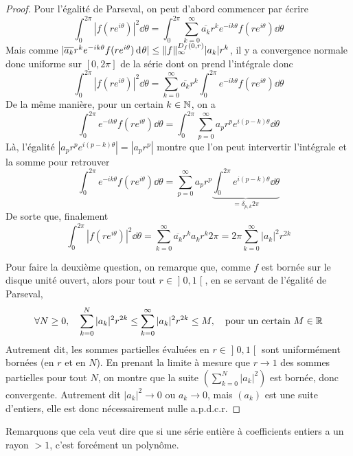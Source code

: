 \documentclass[10pt]{scrartcl}
\begin{document}
    \begin{proof}
        Pour l'égalité de Parseval, on peut d'abord commencer par écrire 
        \[
            \int_0^{2\pi}|f(re^{i\theta})|^2\dd\theta=\int_0^{2\pi}\sum_{k=0}^\infty \overline{a_k}r^ke^{-ik\theta}f(re^{i\theta})\dd\theta
        \]
        Mais comme $|\overline{a_k}r^ke^{-ik\theta}f(re^{i\theta})\operatorname{d\hskip-1pt}\theta|\leq \lVert f\rVert_\infty^{D_f(0,r)}|a_k|r^k$, il y a convergence normale donc uniforme sur $[0,2\pi]$
        de la série dont on prend l'intégrale donc 
        \[
            \int_0^{2\pi}|f(re^{i\theta})|^2\dd\theta=\sum_{k=0}^\infty\overline{a_k}r^k\int_0^{2\pi} e^{-ik\theta}f(re^{i\theta})\dd\theta
        \]
        De la même manière, pour un certain $k\in\operatorname{\mathbb N}$, on a 
        \[
            \int_0^{2\pi} e^{-ik\theta}f(re^{i\theta})\dd\theta=\int_0^{2\pi}\sum_{p=0}^\infty a_pr^pe^{i(p-k)\theta}\dd\theta
        \]
        Là, l'égalité $|a_pr^pe^{i(p-k)\theta}|=|a_pr^p|$ montre que l'on peut intervertir l'intégrale et la somme pour retrouver 
        \[
            \int_0^{2\pi} e^{-ik\theta}f(re^{i\theta})\dd\theta=\sum_{p=0}^\infty a_pr^p\underbrace{\int_0^{2\pi} e^{i(p-k)\theta}\dd\theta}_{=\delta_{p,k}2\pi}
        \]
        De sorte que, finalement 
        \[
            \int_0^{2\pi}|f(re^{i\theta})|^2\dd\theta=\sum_{k=0}^\infty\overline{a_k}r^ka_kr^k2\pi=2\pi\sum_{k=0}^\infty|a_k|^2r^{2k}
        \]


        Pour faire la deuxième question, on remarque que, comme $f$ est bornée sur le disque unité ouvert, 
        alors pour tout $r\in\mathopen]0,1\mathclose[$, en se servant de l'égalité de Parseval, 
        \[
            \forall N\geq0,\quad \sum_{k=0}^N|a_k|^2r^{2k}\leq \sum_{k=0}^\infty |a_k|^2r^{2k}\leq M,\quad \text{pour un certain}\ M\in\operatorname{\mathbb R}
        \]
        Autrement dit, les sommes partielles évaluées en $r\in\mathopen]0,1\mathclose[$ sont uniformément bornées (en $r$ et en $N$).
        En prenant la limite à mesure que $r\to 1$ des sommes partielles pour tout $N$, on montre que la suite $(\sum_{k=0}^N|a_k|^2)$ est bornée,
        donc convergente. Autrement dit $|a_k|^2\to 0$ ou $a_k\to 0$, mais $(a_k)$ est une suite d'entiers, elle est donc nécessairement nulle a.p.d.c.r.
    \end{proof}

    \begin{remarks}
        Remarquons que cela veut dire que si une série entière à coefficients entiers a un rayon $>1$, c'est forcément un polynôme. 
    \end{remarks}
\end{document}
